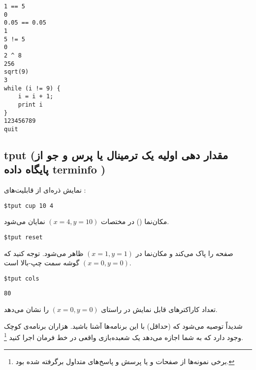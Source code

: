 \begin{latin}
\begin{lstlisting}
1 == 5
0
0.05 == 0.05
1
5 != 5
0
2 ^ 8
256
sqrt(9)
3
while (i != 9) {
	i = i + 1;
	print i
}
123456789
quit
\end{lstlisting}
\end{latin}


\subsection*{{\codefont tput} (مقدار دهی اولیه یک ترمینال یا پرس‌ و جو از پایگاه داده terminfo )}
نمایش ذره‌ای از قابلیت‌های :
\begin{latin}
\begin{lstlisting}
$tput cup 10 4
\end{lstlisting}
\end{latin}
مکان‌نما () در مختصات
$(x = 4, y = 10)$
نمایان می‌شود.

\begin{latin}
\begin{lstlisting}
$tput reset
\end{lstlisting}
\end{latin}
صفحه را پاک می‌کند و مکان‌نما در
$(x = 1, y = 1)$ 
ظاهر می‌شود. توجه کنید که
$(x = 0, y = 0)$
گوشه سمت
چپ-بالا است.
\begin{latin}
\begin{lstlisting}
$tput cols
\end{lstlisting}
\end{latin}

\begin{latin}
\begin{lstlisting}
80
\end{lstlisting}
\end{latin}
تعداد کاراکترهای قابل نمایش در راستای
$(x = 0, y = 0)$
را نشان می‌دهد.

شدیداً توصیه می‌شود که (حداقل) با این برنامه‌ها آشنا باشید. هزاران برنامه‌ی کوچک
وجود دارد که به شما اجازه می‌دهد یک شعبده‌بازی واقعی در خط فرمان اجرا کنید
\footnote{
برخی نمونه‌ها از صفحات  و یا پرسش و پاسخ‌های متداول برگرفته شده بود.
}.